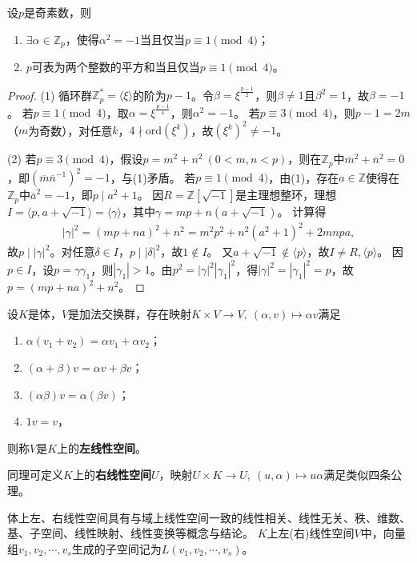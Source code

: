 \documentclass[../../main.tex]{subfiles}%
\begin{document}
\begin{example}
设$p$是奇素数，则
\begin{enumerate}[(1)]
\item $\exists\alpha\in\mathbb{Z}_p$，使得$\alpha^2=-1$当且仅当$p\equiv1\pmod{4}$；
\item $p$可表为两个整数的平方和当且仅当$p\equiv1\pmod{4}$。
\end{enumerate}
\end{example}
\begin{proof}
(1) 循环群$\mathbb{Z}_p^*=\langle\xi\rangle$的阶为$p-1$。令$\beta=\xi^{\frac{p-1}{2}}$，则$\beta\neq1$且$\beta^2=1$，故$\beta=-1$。
若$p\equiv1\pmod{4}$，取$\alpha=\xi^{\frac{p-1}{4}}$，则$\alpha^2=-1$。
若$p\equiv3\pmod{4}$，则$p-1=2m$（$m$为奇数），对任意$k$，$4\nmid\mathrm{ord}(\xi^k)$，故$(\xi^k)^2\neq-1$。

(2) 若$p\equiv3\pmod{4}$，假设$p=m^2+n^2\ (0<m,n<p)$，则在$\mathbb{Z}_p$中$\overline{m}^2+\overline{n}^2=\overline{0}$，即$(\overline{m}\overline{n}^{-1})^2=-1$，与(1)矛盾。
若$p\equiv1\pmod{4}$，由(1)，存在$a\in\mathbb{Z}$使得在$\mathbb{Z}_p$中$\overline{a}^2=-1$，即$p\mid a^2+1$。
因$R=\mathbb{Z}[\sqrt{-1}]$是主理想整环，理想$I=\langle p,a+\sqrt{-1}\rangle=\langle\gamma\rangle$，其中$\gamma=mp+n(a+\sqrt{-1})$。
计算得
\begin{align*}
|\gamma|^2=(mp+na)^2+n^2=m^2p^2+n^2(a^2+1)^2+2mnpa,
\end{align*}
故$p\mid|\gamma|^2$。对任意$\delta\in I$，$p\mid|\delta|^2$，故$1\notin I$。
又$a+\sqrt{-1}\notin\langle p\rangle$，故$I\neq R,\langle p\rangle$。
因$p\in I$，设$p=\gamma\gamma_1$，则$|\gamma_1|>1$。由$p^2=|\gamma|^2|\gamma_1|^2$，得$|\gamma|^2=|\gamma_1|^2=p$，故$p=(mp+na)^2+n^2$。
\end{proof}

\begin{definition}
设$K$是体，$V$是加法交换群，存在映射$K\times V\to V,\ (\alpha,v)\mapsto\alpha v$满足
\begin{enumerate}[(1)]
\item $\alpha(v_1+v_2)=\alpha v_1+\alpha v_2$；
\item $(\alpha+\beta)v=\alpha v+\beta v$；
\item $(\alpha\beta)v=\alpha(\beta v)$；
\item $1v=v$，
\end{enumerate}
则称$V$是$K$上的\textbf{左线性空间}。

同理可定义$K$上的\textbf{右线性空间}$U$，映射$U\times K\to U,\ (u,\alpha)\mapsto u\alpha$满足类似四条公理。
\end{definition}
\begin{remark}
体上左、右线性空间具有与域上线性空间一致的线性相关、线性无关、秩、维数、基、子空间、线性映射、线性变换等概念与结论。
$K$上左(右)线性空间$V$中，向量组$v_1,v_2,\cdots,v_s$生成的子空间记为$L(v_1,v_2,\cdots,v_s)$。
\end{remark}
\end{document}
